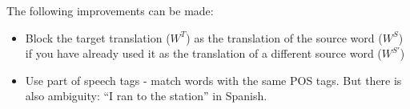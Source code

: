  The following improvements can be made: 
 \begin{itemize}
 	\item Block the target translation ($W^T$) as the translation of the source 
 	word ($W^S$) if you have already used it as the translation of a different 
 	source word ($W^{S'}$)
 	\item Use part of speech tags - match words with the same POS tags. But 
 	there is also ambiguity: ``I ran to the station'' in Spanish. 
 \end{itemize}


